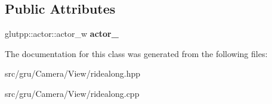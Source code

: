 \subsection*{\-Public \-Attributes}
\begin{DoxyCompactItemize}
\item 
\hypertarget{classglutpp_1_1Camera_1_1View_1_1ridealong_abf4b639b7731da7c44d2b4b6625c89b9}{glutpp\-::actor\-::actor\-\_\-w {\bfseries actor\-\_\-}}\label{classglutpp_1_1Camera_1_1View_1_1ridealong_abf4b639b7731da7c44d2b4b6625c89b9}

\end{DoxyCompactItemize}


\-The documentation for this class was generated from the following files\-:\begin{DoxyCompactItemize}
\item 
src/gru/\-Camera/\-View/ridealong.\-hpp\item 
src/gru/\-Camera/\-View/ridealong.\-cpp\end{DoxyCompactItemize}

